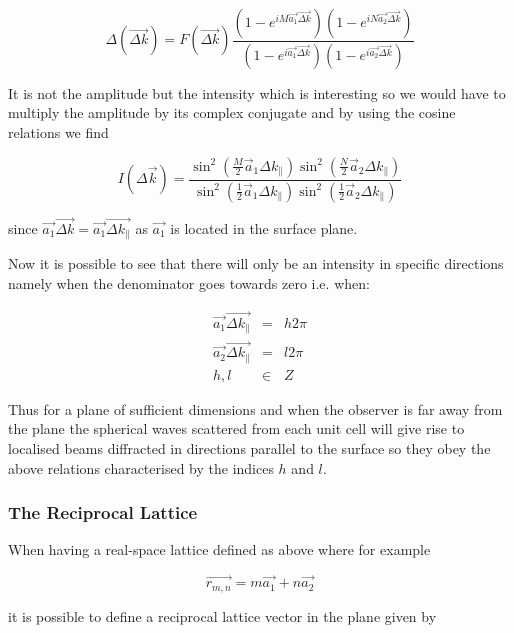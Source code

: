 \begin{equation}
\Delta(\vec{\Delta k})=F(\vec{\Delta k})\frac{(1-e^{iM\vec{a_1}\vec{\Delta k}})(1-e^{iN\vec{a_2}\vec{\Delta k}})}{(1-e^{i\vec{a_1}\vec{\Delta k}})(1-e^{i\vec{a_2}\vec{\Delta k}})}
\end{equation}

It is not the amplitude but the intensity which is interesting so we would have to multiply the amplitude by its complex conjugate and by using the cosine relations we find

\begin{equation}
I(\Delta \vec{k}) = \frac{\sin^2\left(\frac{M}{2}\vec{a}_1 \Delta k_{\parallel}\right) \sin^2\left(\frac{N}{2}\vec{a}_2 \Delta k_{\parallel}\right)}{\sin^2\left(\frac{1}{2}\vec{a}_1 \Delta k_{\parallel}\right) \sin^2\left(\frac{1}{2}\vec{a}_2 \Delta k_{\parallel}\right)}
\end{equation}

\noindent since $\vec{a_1}\vec{\Delta k}=\vec{a_1}\vec{\Delta k_{\parallel}}$ as $\vec{a_1}$ is located in the surface plane.

Now it is possible to see that there will only be an intensity in specific directions namely when the denominator goes towards zero i.e. when:

\begin{eqnarray}
\vec{a_1}\vec{\Delta k_{\parallel}}	& =	& h2\pi \\
\vec{a_2}\vec{\Delta k_{\parallel}} & =	& l2\pi \\
h,l	& \in	& Z
\end{eqnarray}

Thus for a plane of sufficient dimensions and when the observer is far away from the plane the spherical waves scattered from each unit cell will give rise to localised beams diffracted in directions parallel to the surface so they obey the above relations characterised by the indices $h$ and $l$.

\subsubsection{The Reciprocal Lattice}
When having a real-space lattice defined as above where for example

\begin{equation}
\vec{r_{m,n}}=m\vec{a_1}+n\vec{a_2}
\end{equation}

\noindent it is possible to define a reciprocal lattice vector in the plane given by

